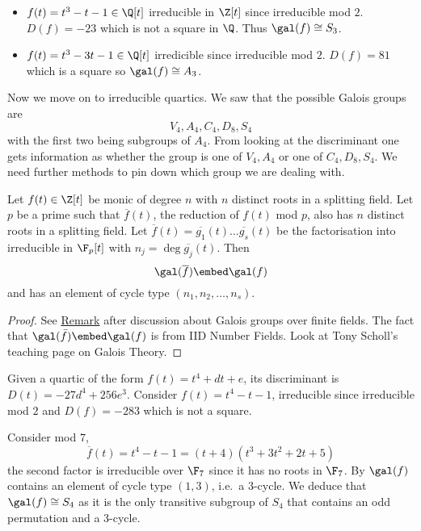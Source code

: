 \documentclass[a4paper]{article}
\newcommand*{\red}[1]{\overline{#1}}
\begin{document}
\begin{eg}\leavevmode
  \begin{itemize}
  \item \(f(t) = t^3 - t - 1 \in \Q[t]\) irreducible in \(\Z[t]\) since irreducible mod \(2\). \(D(f) = -23\) which is not a square in \(\Q\). Thus \(\gal(f) \cong S_3\).
  \item \(f(t) = t^3 - 3t - 1 \in \Q[t]\) irredicible since irreducible mod \(2\). \(D(f) = 81\) which is a square so \(\gal(f) \cong A_3\).
  \end{itemize}
\end{eg}

Now we move on to irreducible quartics. We saw that the possible Galois groups are
\[
  V_4, A_4, C_4, D_8, S_4
\]
with the first two being subgroups of \(A_4\). From looking at the discriminant one gets information as whether the group is one of \(V_4, A_4\) or one of \(C_4, D_8, S_4\). We need further methods to pin down which group we are dealing with.

\begin{theorem}
  \label{thm:mod p reduction}
  Let \(f(t) \in \Z[t]\) be monic of degree \(n\) with \(n\) distinct roots in a splitting field. Let \(p\) be a prime such that \(\red f(t)\), the reduction of \(f(t)\) mod \(p\), also has \(n\) distinct roots in a splitting field. Let \(\red f(t) = \red{g_1}(t) \dots \red{g_s}(t)\) be the factorisation into irreducible in \(\F_p[t]\) with \(n_j =  \deg \red{g_j}(t)\). Then
  \[
    \gal(\red f) \embed \gal(f)
  \]
  and has an element of cycle type \((n_1, n_2, \dots, n_s)\).
\end{theorem}

\begin{proof}
  See \hyperref[rmk:mod p reduction]{Remark} after discussion about Galois groups over finite fields. The fact that \(\gal(\bar f) \embed \gal(f)\) is from IID Number Fields. Look at Tony Scholl's teaching page on Galois Theory.
\end{proof}

\begin{eg}
  Given a quartic of the form \(f(t) = t^4 + dt + e\), its discriminant is \(D(t) = -27d^4 + 256e^3\). Consider \(f(t) = t^4 - t -1\), irreducible since irreducible mod \(2\) and \(D(f) = -283\) which is not a square.

  Consider mod \(7\),
  \[
    \red f(t) = t^4 - t - 1 = (t + 4)(t^3 + 3t^2 + 2t + 5)
  \]
  the second factor is irreducible over \(\F_7\) since it has no roots in \(\F_7\). By  \(\gal(f)\) contains an element of cycle type \((1, 3)\), i.e.\ a \(3\)-cycle. We deduce that \(\gal(f) \cong S_4\) as it is the only transitive subgroup of \(S_4\) that contains an odd permutation and a \(3\)-cycle.
\end{eg}
\end{document}
